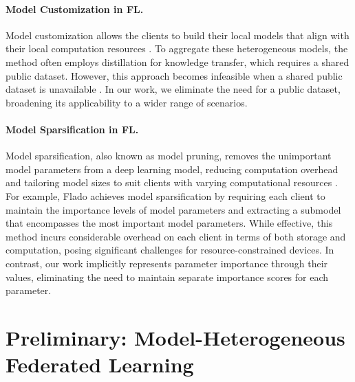 \documentclass{article}
\renewcommand{\cite}{\citep}
\theoremstyle{plain}
\theoremstyle{definition}
\theoremstyle{remark}
\begin{document}
\paragraph{Model Customization in FL.}
Model customization allows the clients to build their local models that align with their local computation resources \cite{lin2020ensemble, zhang2021parameterized, itahara2021distillation, cho2022heterogeneous, wang2023towards, zhang2023distill}. To aggregate these heterogeneous models, the method often employs distillation for knowledge transfer, which requires a shared public dataset. However, this approach becomes infeasible when a shared public dataset is unavailable \cite{stanton2021does, alballa2023first}. In our work, we eliminate the need for a public dataset, broadening its applicability to a wider range of scenarios.

\paragraph{Model Sparsification in FL.}
Model sparsification, also known as model pruning, removes the unimportant model parameters from a deep learning model, reducing computation overhead and tailoring model sizes to suit clients with varying computational resources \cite{zhou2023every, liao2023adaptive, chen2023efficient}. For example, Flado \cite{liao2023adaptive} achieves model sparsification by requiring each client to maintain the importance levels of model parameters and extracting a submodel that encompasses the most important model parameters. While effective, this method incurs considerable overhead on each client in terms of both storage and computation, posing significant challenges for resource-constrained devices. In contrast, our work implicitly represents parameter importance through their values, eliminating the need to maintain separate importance scores for each parameter.


\section{Preliminary: Model-Heterogeneous Federated Learning} \label{sec:preliminary}
\end{document}
